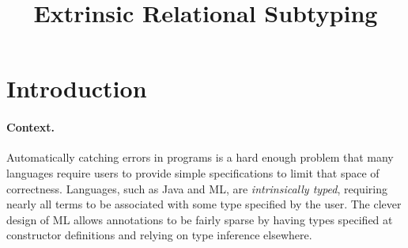 \documentclass[acmsmall]{acmart}
\title{Extrinsic Relational Subtyping}
\theoremstyle{definition}
\begin{document}
\newcommand{\code}[1]{\texttt{#1}}
\newcommand{\entails}{\vdash}
\newcommand{\satisfies}{\vDash}
\newcommand{\given}{\dashv}

\newcommand{\ttilde}{\textasciitilde{}}

\newcommand{\multi}[1]{\widebar{\ #1\ }}
\newcommand{\hastype}{:}
\newcommand{\pattype}{\ \lozenge\ }
\newcommand{\liftfun}{\ \blacktriangle\ }
 
\newcommand{\subtypes}{<:}
\newcommand{\I}{\hspace{4mm}}
\newcommand{\Z}{.\hspace{4mm}}
\newcommand{\Alpha}{\mathrm{A}}
\newcommand{\Tau}{\mathrm{T}}
\newcommand{\B}[1]{\textbf{#1}}
\newcommand{\F}[1]{\text{#1}}
\newcommand{\bigand}{\bigwedge\nolimits}
\newcommand{\bigor}{\bigvee\nolimits}
\newcommand{\C}[1]{\color{teal} \rhd\ \emph{#1}}
\newcommand{\D}[1]{\small \textsc{#1}}
\newcommand{\FIG}[1]{Fig. {\color{red} \ref{#1}}}
\newcommand{\TODO}[1]{\noindent \B{\color{red} TODO: #1}}

\newcommand{\is}{\ ::=\ }
\newcommand{\sep}{\ \ |\ \ }
\newcommand{\nonterm}[1]{#1\ }
\newcommand{\contin}{|\ \ \ \ \ \ \ }
\newcommand{\case}{\B{case }}
\newcommand{\wrt}{\B{wrt }}
     



\maketitle


\section{Introduction}

\paragraph{Context.} 

Automatically catching errors in programs is a hard enough problem
that many languages require users to provide simple specifications to limit that space of correctness.
Languages, such as Java and ML, are \textit{intrinsically typed}, 
requiring nearly all terms to be associated with some type specified by the user. 
The clever design of ML allows annotations to be fairly sparse by 
having types specified at constructor definitions and relying on type inference elsewhere.
\end{document}
